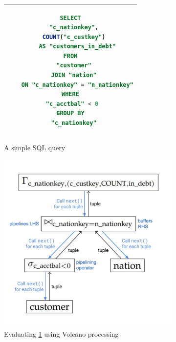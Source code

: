 \begin{figure}
\centering
\begin{subfigure}[b]{0.49\textwidth}
    \centering
    \begin{tabular}{|c|}
    \hline
    \begin{lstlisting}[language=SQL]
SELECT
  "c_nationkey",
  COUNT("c_custkey")
    AS "customers_in_debt"
FROM
  "customer"
  JOIN "nation"
    ON "c_nationkey" = "n_nationkey"
WHERE
  "c_acctbal" < 0 
GROUP BY
  "c_nationkey"
    \end{lstlisting} \\
    \hline
    \end{tabular}
    \caption{A simple SQL query}
    \label{fig:simple-query}
\end{subfigure}
\begin{subfigure}[b]{0.49\textwidth}
    \centering
    \includegraphics[width=0.9\linewidth]{introduction/volcano.pdf}
    \caption{Evaluating \ref{fig:simple-query} using Volcano processing}
    \label{fig:volcano-processing}
\end{subfigure}
\\[5ex]
\begin{subfigure}[b]{0.49\textwidth}
    \centering

\end{subfigure}
\end{figure}
